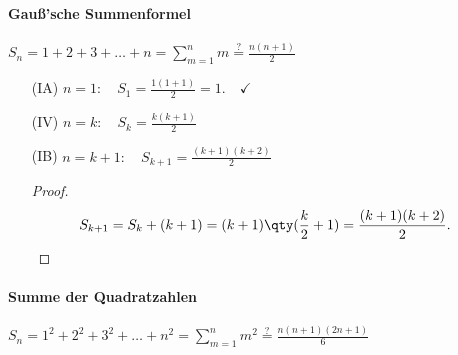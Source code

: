 \paragraph{Gauß'sche Summenformel} $S_n = 1 +2+3+\hdots + n = \sum_{m=1}^n m \overset{?}{=} \frac{n(n+1)}{2}$

\begin{enumerate}
    \item[(IA)] $\displaystyle n=1: \quad S_1 = \frac{1(1+1)}{2} = 1 .\quad\checkmark$ 
    \item[(IV)] $\displaystyle n=k: \quad S_k = \frac{k(k+1)}{2}$
    \item[(IB)] $\displaystyle n=k+1:\quad S_{k+1} = \frac{(k+1)(k+2)}{2}$
    \begin{proof}$~$\\[-1.5cm]
        \begin{align}
            S_{k+1} &= S_k + (k+1) = (k+1)\qty(\frac{k}{2}+1) = \frac{(k+1)(k+2)}{2}.
        \end{align}
    \end{proof}
\end{enumerate}

\paragraph{Summe der Quadratzahlen} $S_n = 1^2 + 2^2 + 3^2+\hdots + n^2 = \sum_{m=1}^n m^2 \overset{?}{=} \frac{n(n+1)(2n+1)}{6}$

